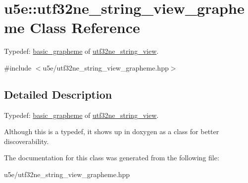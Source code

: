 \hypertarget{classu5e_1_1utf32ne__string__view__grapheme}{}\section{u5e\+:\+:utf32ne\+\_\+string\+\_\+view\+\_\+grapheme Class Reference}
\label{classu5e_1_1utf32ne__string__view__grapheme}


Typedef\+: \hyperlink{classu5e_1_1basic__grapheme}{basic\+\_\+grapheme} of \hyperlink{classu5e_1_1utf32ne__string__view}{utf32ne\+\_\+string\+\_\+view}.  




{\ttfamily \#include $<$u5e/utf32ne\+\_\+string\+\_\+view\+\_\+grapheme.\+hpp$>$}



\subsection{Detailed Description}
Typedef\+: \hyperlink{classu5e_1_1basic__grapheme}{basic\+\_\+grapheme} of \hyperlink{classu5e_1_1utf32ne__string__view}{utf32ne\+\_\+string\+\_\+view}. 

Although this is a typedef, it shows up in doxygen as a class for better discoverability. 

The documentation for this class was generated from the following file\+:\begin{DoxyCompactItemize}
\item 
u5e/utf32ne\+\_\+string\+\_\+view\+\_\+grapheme.\+hpp\end{DoxyCompactItemize}

